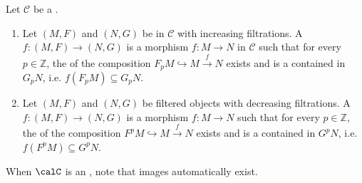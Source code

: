 \begin{definition} \label{definition:morphism_of_filtered_objects_in_a_category}
Let $\mathcal{C}$ be a .
\begin{enumerate}
    \item Let $(M, F)$ and $(N, G)$ be  in $\mathcal{C}$ with increasing filtrations. 
    A  $f: (M, F) \to (N, G)$ is a morphism $f: M \to N$ in $\mathcal{C}$ such that for every $p \in \mathbb{Z}$, the  of the composition $F_p M \hookrightarrow M \xrightarrow{f} N$ exists and is a  contained in $G_p N$, i.e. $f(F_p M) \subseteq G_p N$.

    \item Let $(M, F)$ and $(N, G)$ be filtered objects with decreasing filtrations. A  $f: (M, F) \to (N, G)$ is a morphism $f: M \to N$ such that for every $p \in \mathbb{Z}$, the  of the composition $F^p M \hookrightarrow M \xrightarrow{f} N$ exists  and is a  contained in $G^p N$, i.e. $f(F^p M) \subseteq G^p N$.
\end{enumerate}
When $\calC$ is an , note that images automatically exist.
\end{definition}